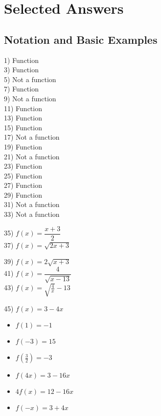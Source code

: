 \documentclass[12pt]{book}
\theoremstyle{definition}
\begin{document}
\section{Selected Answers}
\subsection*{Notation and Basic Examples}

\begin{multicols}{3}
1) Function\\
3) Function\\
5) Not a function\\
7) Function\\
9) Not a function\\
11) Function\\
13) Function\\
15) Function\\
17) Not a function\\
19) Function\\
21) Not a function\\
23) Function\\
25) Function\\
27) Function\\
29) Function\\
31) Not a function\\
33) Not a function\\
\end{multicols}

\begin{multicols}{2}
35) $f(x)=\dfrac{x+3}{2}$\\
37) $f(x)=\sqrt{2x+3}$
\end{multicols}
\begin{multicols}{3}
39) $f(x)=2\sqrt{x+3}$\\
41) $f(x)=\dfrac{4}{\sqrt{x-13}}$\\
43) $f(x)=\sqrt{\frac{4}{x}}-13$
\end{multicols}
45) $f(x)=3-4x$
\begin{multicols}{3}
\begin{itemize}
\item $f(1)=-1$
\item $f(-3)=15$
\item $f\left(\frac{3}{2} \right)=-3$
\end{itemize}
\end{multicols}

\begin{multicols}{3}
\begin{itemize}
\item  $f(4x)=3-16x$
\item $4f(x)=12-16x$
\item $f(-x)=3+4x$
\end{itemize}
\end{multicols}
\end{document}
